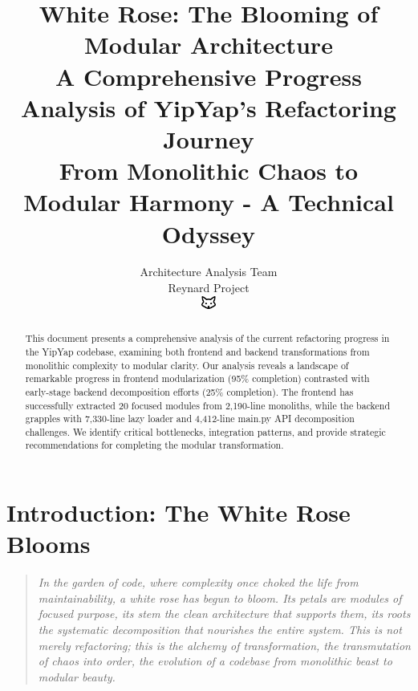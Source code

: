\documentclass[11pt]{article}
\begin{document}
\title{\textbf{White Rose: The Blooming of Modular Architecture} \\
\Large{A Comprehensive Progress Analysis of YipYap's Refactoring Journey} \\
\large{From Monolithic Chaos to Modular Harmony - A Technical Odyssey}}

\author{Architecture Analysis Team\\
Reynard Project\\
\includegraphics[width=0.5cm]{favicon.pdf}}

\maketitle

\begin{abstract}
This document presents a comprehensive analysis of the current refactoring progress in the YipYap codebase, examining both frontend and backend transformations from monolithic complexity to modular clarity. Our analysis reveals a landscape of remarkable progress in frontend modularization (95\% completion) contrasted with early-stage backend decomposition efforts (25\% completion). The frontend has successfully extracted 20 focused modules from 2,190-line monoliths, while the backend grapples with 7,330-line lazy loader and 4,412-line main.py API decomposition challenges. We identify critical bottlenecks, integration patterns, and provide strategic recommendations for completing the modular transformation.
\end{abstract}

\tableofcontents
\newpage

\section{Introduction: The White Rose Blooms}

\begin{quote}
\emph{In the garden of code, where complexity once choked the life from maintainability, a white rose has begun to bloom. Its petals are modules of focused purpose, its stem the clean architecture that supports them, its roots the systematic decomposition that nourishes the entire system. This is not merely refactoring; this is the alchemy of transformation, the transmutation of chaos into order, the evolution of a codebase from monolithic beast to modular beauty.}
\end{quote}
\end{document}
